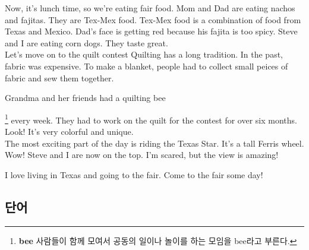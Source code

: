 \documentclass[9pt, a4paper]{oblivoir}
\renewcommand{\thefootnote}{\alph{footnote}}
\newcommand{\symfootnote}[1]{%
\let\oldthefootnote=\thefootnote%
\stepcounter{mpfootnote}%
\addtocounter{footnote}{-1}%
\renewcommand{\thefootnote}{\fnsymbol{mpfootnote}}%
\footnote{#1}%
\let\thefootnote=\oldthefootnote%
}
\begin{document}
        Now, it's lunch time, so we're eating fair food. Mom and Dad are eating nachos and fajitas. They are Tex-Mex food. Tex-Mex food is a combination of food from Texas and Mexico. Dad's face is getting red because his fajita is too spicy. Steve and I are eating corn dogs. They taste great.
    \\

        Let's move on to the quilt contest Quilting has a long tradition. In the past, fabric was expensive. To make a blanket, people had to collect small peices of fabric and sew them together. 

        Grandma and her friends had a quilting bee\symfootnote{\textbf{bee} 사람들이 함께 모여서 공동의 일이나 놀이를 하는 모임을 bee라고 부른다.} every week. They had to work on the quilt for the contest for over six months. Look! It's very colorful and unique.
        \\


        The most exciting part of the day is riding the Texas Star. It's a tall Ferris wheel. Wow! Steve and I are now on the top. I'm scared, but the view is amazing! 

        I love living in Texas and going to the fair. Come to the fair some day! \bigskip

        \vspace*{6cm}

        \subsection*{단어}
            
            
            
            
            
            
            
            
            
            
            
            
\end{document}
